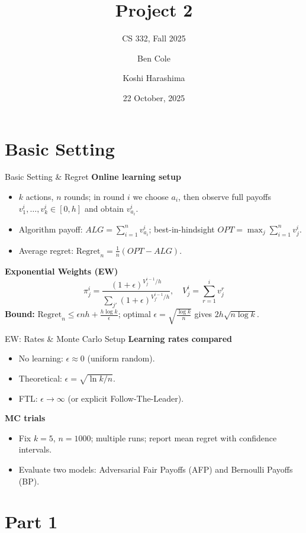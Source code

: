 \documentclass{beamer}
\title[Project 2]{Project 2}
\subtitle{CS 332, Fall 2025}
\author{Ben Cole \and Koshi Harashima}
\date{22 October, 2025}
\begin{document}
\maketitle

\section{Basic Setting}

\begin{frame}{Basic Setting \& Regret}
\textbf{Online learning setup}
\begin{itemize}
  \item $k$ actions, $n$ rounds; in round $i$ we choose $a_i$, then observe full payoffs $v_1^i,\dots,v_k^i\in[0,h]$ and obtain $v_{a_i}^i$.
  \item Algorithm payoff: $ALG=\sum_{i=1}^n v_{a_i}^i$; best-in-hindsight $OPT=\max_j \sum_{i=1}^n v_j^i$.
  \item Average regret: $\mathrm{Regret}_n=\frac{1}{n}(OPT-ALG)$.
\end{itemize}
\medskip
\textbf{Exponential Weights (EW)}
\[
\pi_j^i=\frac{(1+\epsilon)^{V_j^{i-1}/h}}{\sum_{j'}(1+\epsilon)^{V_{j'}^{i-1}/h}},\quad
V_j^{i}=\sum_{r=1}^{i}v_j^r
\]
\textbf{Bound:} $\mathrm{Regret}_n\le \epsilon n h+\frac{h\log k}{\epsilon}$; optimal $\epsilon=\sqrt{\frac{\log k}{n}}$ gives $2h\sqrt{n\log k}$.
\end{frame}

\begin{frame}{EW: Rates \& Monte Carlo Setup}
\textbf{Learning rates compared}
\begin{itemize}
  \item No learning: $\epsilon\approx 0$ (uniform random).
  \item Theoretical: $\epsilon=\sqrt{\ln k / n}$.
  \item FTL: $\epsilon\to\infty$ (or explicit Follow-The-Leader).
\end{itemize}
\textbf{MC trials}
\begin{itemize}
  \item Fix $k=5$, $n=1000$; multiple runs; report mean regret with confidence intervals.
  \item Evaluate two models: Adversarial Fair Payoffs (AFP) and Bernoulli Payoffs (BP).
\end{itemize}
\end{frame}

\section{Part 1}
\end{document}
